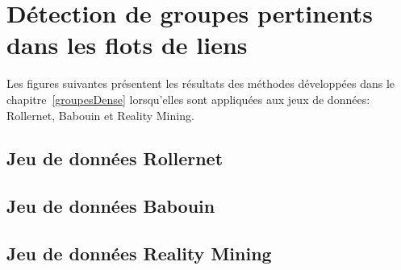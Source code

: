 \appendix
\chapter{Détection de groupes pertinents dans les flots de liens}
Les figures suivantes présentent les résultats des méthodes développées dans le chapitre~\ref{groupesDense} lorsqu'elles sont appliquées aux jeux de données: Rollernet, Babouin et Reality Mining.


\section{Jeu de données Rollernet}
\clearpage
{}

\clearpage
\section{Jeu de données Babouin}
\clearpage
{}
\clearpage

\section{Jeu de données Reality Mining}

\clearpage
{}

\clearpage